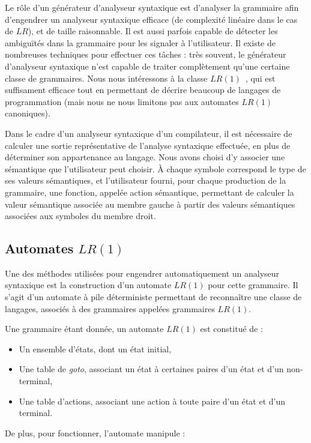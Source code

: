 \documentclass[a4paper,11pt]{article}
\begin{document}
Le rôle d'un générateur d'analyseur syntaxique est d'analyser la
grammaire afin d'engendrer un analyseur syntaxique efficace (de
complexité linéaire dans le cas de $LR$), et de taille raisonnable. Il
est aussi parfois capable de détecter les ambiguïtés dans la grammaire
pour les signaler à l'utilisateur. Il existe de nombreuses techniques
pour effectuer ces tâches : très souvent, le générateur d'analyseur
syntaxique n'est capable de traiter complètement qu'une certaine
classe de grammaires. Nous nous intéressons à la classe
$LR(1)$~\cite{lr}, qui est suffisament efficace tout en permettant de
décrire beaucoup de langages de programmation (mais nous ne nous
limitons pas aux automates $LR(1)$ canoniques).

Dans le cadre d'un analyseur syntaxique d'un compilateur, il est
nécessaire de calculer une sortie représentative de l'analyse
syntaxique effectuée, en plus de déterminer son appartenance au
langage. Nous avons choisi d'y associer une sémantique que
l'utilisateur peut choisir. \`A chaque symbole correspond le type de
ses valeurs sémantiques, et l'utilisateur fourni, pour chaque
production de la grammaire, une fonction, appelée action sémantique,
permettant de calculer la valeur sémantique associée au membre gauche
à partir des valeurs sémantiques associées aux symboles du membre
droit.

\subsection{Automates $LR(1)$}

Une des méthodes utilisées pour engendrer automatiquement un analyseur
syntaxique est la construction d'un automate $LR(1)$ pour cette
grammaire. Il s'agit d'un automate à pile déterministe permettant de
reconnaître une classe de langages, associés à des grammaires appelées
grammaires $LR(1)$.

Une grammaire étant donnée, un automate $LR(1)$ est constitué de :

\begin{itemize}
\item Un ensemble d'états, dont un état initial,
\item Une table de \emph{goto}, associant un état à certaines paires
  d'un état et d'un non-terminal,
\item Une table d'actions, associant une action à toute paire d'un état
  et d'un terminal.
\end{itemize}

De plus, pour fonctionner, l'automate manipule :
\end{document}
